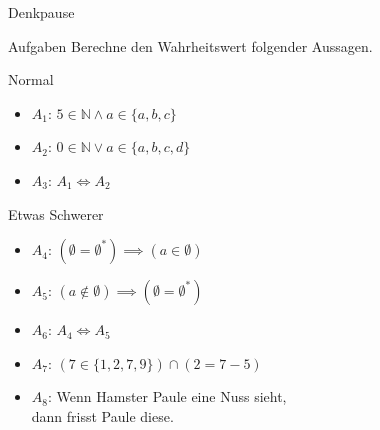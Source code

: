 {
\begin{frame}[fragile]{Denkpause}
    \begin{alertblock}{Aufgaben}
      Berechne den Wahrheitswert folgender Aussagen.
    \end{alertblock}
    \begin{block}{Normal}
    \begin{itemize}
        \item $A_1$: $5 \in \mathbb{N} \wedge a \in \{a, b, c\}$
        \item $A_2$: $0 \in \mathbb{N} \vee a \in \{a, b, c, d\}$
        \item $A_3$: $A_1 \iff A_2$
    \end{itemize}
    \end{block}
    \begin{block}{Etwas Schwerer}
    \begin{itemize}
        \item $A_4$: $(\emptyset=\emptyset^{*}) \implies (a \in \emptyset)$
        \item $A_5$: $(a \notin \emptyset) \implies (\emptyset = \emptyset^{*})$
        \item $A_6$: $A_4 \iff A_5$
        \item $A_7$: $(7 \in \{1, 2, 7, 9\}) \cap (2 = 7-5)$
        \item $A_8$: Wenn Hamster Paule eine Nuss sieht,\\
		\quad dann frisst Paule diese.
    \end{itemize}
    \end{block}
\end{frame}
}


